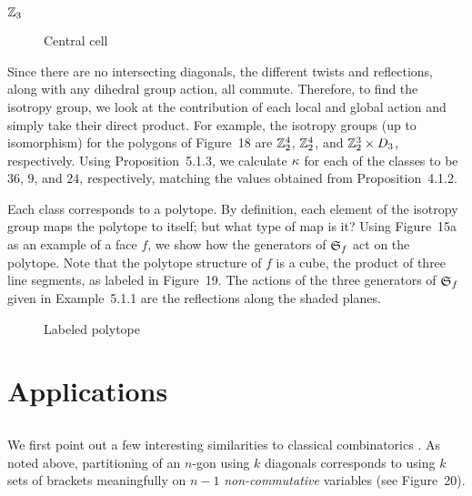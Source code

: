 \documentclass[10pt]{amsart}
\begin{document}
        ${\mathbb Z}_3$

        \begin{figure}[h]
            \caption{Central cell}
            \label{centercell}
            \end{figure}
            
            Since there are no intersecting diagonals, the different twists and reflections, along with any dihedral group action, all commute. Therefore, to find the isotropy group, we look at the  contribution of each local and global action and simply take their direct product.  For example, the isotropy groups (up to isomorphism) for the polygons of Figure~18 are ${\mathbb Z}_2^4$, ${\mathbb Z}_2^4$, and ${\mathbb Z}_2^3 \times D_3$, respectively.  Using Proposition~5.1.3, we calculate $\kappa$ for each of the classes to be $36$, $9$, and $24$, respectively, matching the values obtained from Proposition~4.1.2.
             
            \begin{rem}
            Each class corresponds to a polytope. By definition, each element of the isotropy group maps the polytope to itself; but what type of map is it? Using Figure~15a as an example of a face $f$, we show how the generators of ${\mathfrak S}_f$ act on the polytope.  Note that the polytope structure of $f$ is a cube, the product of three line segments, as labeled in Figure~19. The actions of the three generators of ${\mathfrak S}_f$ given in Example~5.1.1 are the reflections along the shaded planes.
            \end{rem}
            
            \begin{figure}[h]
            \caption{Labeled polytope}
            \label{isocube}
            \end{figure}
            
                                                                        
            \section {Applications}
            
            \subsection{}
            We first point out a few interesting similarities to classical combinatorics \cite[\S1.15]{comtet}.  As noted above, partitioning of an $n$-gon using $k$ diagonals corresponds to using $k$ sets of brackets meaningfully on $n-1$ {\em non-commutative} variables (see Figure~20). 
             
\end{document}
